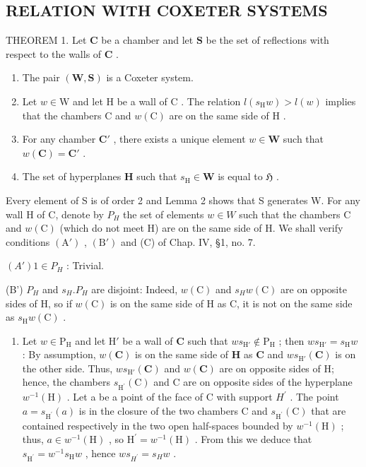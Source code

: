 \subsection{RELATION WITH COXETER SYSTEMS}

THEOREM 1. Let \(\mathbf{C}\) be a chamber and let \(\mathbf{S}\) be the set of reflections with respect to the walls of \(\mathbf{C}\) .

\begin{enumerate}
\def\labelenumi{(\roman{enumi})}
\item
  The pair \((\mathbf{W},\mathbf{S})\) is a Coxeter system.
\item
  Let \(w \in \mathrm{W}\) and let \(\mathrm{H}\) be a wall of \(\mathrm{C}\) . The relation \(l(s_{\mathrm{H}}w) > l(w)\) implies that the chambers \(\mathrm{C}\) and \(w(\mathrm{C})\) are on the same side of \(\mathrm{H}\) .
\item
  For any chamber \(\mathbf{C}'\) , there exists a unique element \(w \in \mathbf{W}\) such that \(w(\mathbf{C}) = \mathbf{C}'\) .
\item
  The set of hyperplanes \(\mathbf{H}\) such that \(s_{\mathrm{H}} \in \mathbf{W}\) is equal to \(\mathfrak{H}\) .
\end{enumerate}

Every element of S is of order 2 and Lemma 2 shows that S generates W. For any wall H of C, denote by \(P_{H}\) the set of elements \(w \in W\) such that the chambers C and \(w(\mathrm{C})\) (which do not meet H) are on the same side of H. We shall verify conditions \((\mathrm{A}')\) , \((\mathrm{B}')\) and (C) of Chap. IV, §1, no. 7.

\((A') 1 \in P_H\) : Trivial.

(B') \(P_{H}\) and \(s_{H}.P_{H}\) are disjoint: Indeed, \(w(\mathrm{C})\) and \(s_{H}w(\mathrm{C})\) are on opposite sides of H, so if \(w(\mathrm{C})\) is on the same side of H as C, it is not on the same side as \(s_{\mathrm{H}}w(\mathrm{C})\) .

\begin{enumerate}
\def\labelenumi{(\Alph{enumi})}
\setcounter{enumi}{2}
\tightlist
\item
  Let \(w \in \mathrm{P_H}\) and let \(\mathrm{H}'\) be a wall of \(\mathbf{C}\) such that \(ws_{\mathrm{H}'} \notin \mathrm{P_H}\) ; then \(ws_{\mathrm{H}'} = s_{\mathrm{H}}w\) : By assumption, \(w(\mathbf{C})\) is on the same side of \(\mathbf{H}\) as \(\mathbf{C}\) and \(ws_{\mathrm{H}'}(\mathbf{C})\) is on the other side. Thus, \(ws_{\mathrm{H}'}(\mathbf{C})\) and \(w(\mathbf{C})\) are on opposite sides of H; hence, the chambers \(s_{\mathrm{H}^{\prime}}(\mathrm{C})\) and C are on opposite sides of the hyperplane \(w^{-1}(\mathrm{H})\) . Let a be a point of the face of C with support \(H^{\prime}\) . The point \(a = s_{\mathrm{H}^{\prime}}(a)\) is in the closure of the two chambers C and \(s_{\mathrm{H}^{\prime}}(\mathrm{C})\) that are contained respectively in the two open half-spaces bounded by \(w^{-1}(\mathrm{H})\) ; thus, \(a \in w^{-1}(\mathrm{H})\) , so \(\mathrm{H}^{\prime} = w^{-1}(\mathrm{H})\) . From this we deduce that \(s_{\mathrm{H}^{\prime}} = w^{-1}s_{\mathrm{H}}w\) , hence \(ws_{H^{\prime}} = s_{H}w\) .
\end{enumerate}


